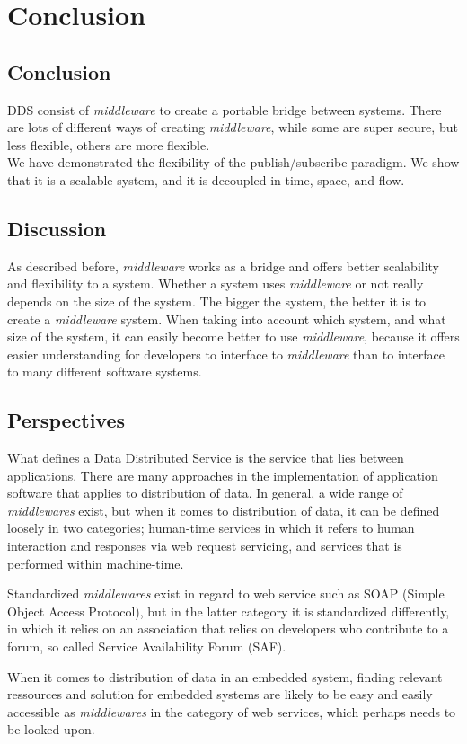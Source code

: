 \chapter{Conclusion}
\section{Conclusion}
DDS consist of \emph{middleware} to create a portable bridge between systems.
There are lots of different ways of creating \emph{middleware}, while some are super secure, but less flexible, others are more flexible. \\
We have demonstrated the flexibility of the publish/subscribe paradigm. We show that it is a scalable system, and it is decoupled in time, space, and flow.

\section{Discussion}
As described before, \emph{middleware} works as a bridge and offers better scalability and flexibility to a system. Whether a system uses \emph{middleware} or not really depends on the size of the system. The bigger the system, the better it is to create a \emph{middleware} system. When taking into account which system, and what size of the system, it can easily become better to use \emph{middleware}, because it offers easier understanding for developers to interface to \emph{middleware} than to interface to many different software systems.\\

\section{Perspectives}
What defines a Data Distributed Service is the service that lies between applications. There are many approaches in the implementation of application software that applies to distribution of data. In general, a wide range of \emph{middlewares} exist, but when it comes to distribution of data, it can be defined loosely in two categories; human-time services in which it refers to human interaction and responses via web request servicing, and services that is performed within machine-time.

Standardized \emph{middlewares} exist in regard to web service such as SOAP (Simple Object Access Protocol), but in the latter category it is standardized differently, in which it relies on an association that relies on developers who contribute to a forum, so called Service Availability Forum (SAF).

When it comes to distribution of data in an embedded system, finding relevant ressources and solution for embedded systems are likely to be easy and easily accessible as \emph{middlewares} in the category of web services, which perhaps needs to be looked upon. 